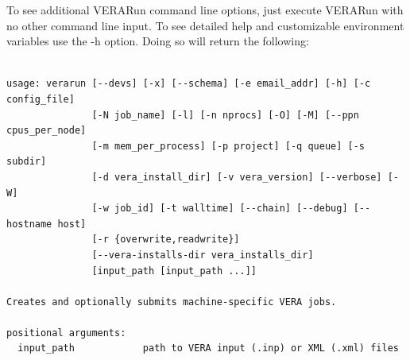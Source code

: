 To see additional VERARun command line options, just execute VERARun with no other command line input.
To see detailed help and customizable environment variables use the -h option.
Doing so will return the following:

\begin{Verbatim}[fontsize=\small]

usage: verarun [--devs] [-x] [--schema] [-e email_addr] [-h] [-c config_file]
               [-N job_name] [-l] [-n nprocs] [-O] [-M] [--ppn cpus_per_node]
               [-m mem_per_process] [-p project] [-q queue] [-s subdir]
               [-d vera_install_dir] [-v vera_version] [--verbose] [-W]
               [-w job_id] [-t walltime] [--chain] [--debug] [--hostname host]
               [-r {overwrite,readwrite}]
               [--vera-installs-dir vera_installs_dir]
               [input_path [input_path ...]]

Creates and optionally submits machine-specific VERA jobs.

positional arguments:
  input_path            path to VERA input (.inp) or XML (.xml) files


\end{Verbatim}
